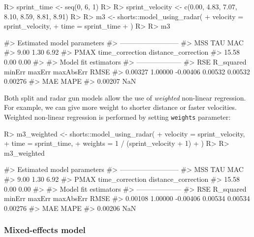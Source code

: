 \documentclass[
]{jss}
\begin{document}
\begin{CodeChunk}
\begin{CodeInput}
R> sprint_time <- seq(0, 6, 1)
R> 
R> sprint_velocity <- c(0.00, 4.83, 7.07, 8.10, 8.59, 8.81, 8.91)
R> 
R> m3 <- shorts::model_using_radar(
+   velocity = sprint_velocity,
+   time = sprint_time
+ )
R> 
R> m3
\end{CodeInput}
\begin{CodeOutput}
#> Estimated model parameters
#> --------------------------
#>                 MSS                 TAU                 MAC 
#>                9.00                1.30                6.92 
#>                PMAX     time_correction distance_correction 
#>               15.58                0.00                0.00 
#> 
#> Model fit estimators
#> --------------------
#>       RSE R_squared    minErr    maxErr maxAbsErr      RMSE 
#>   0.00327   1.00000  -0.00406   0.00532   0.00532   0.00276 
#>       MAE      MAPE 
#>   0.00207       NaN
\end{CodeOutput}
\end{CodeChunk}

Both split and radar gun models allow the use of \emph{weighted} non-linear regression. For example, we can give more weight to shorter distance or faster velocities. Weighted non-linear regression is performed by setting \texttt{weights} parameter:

\begin{CodeChunk}
\begin{CodeInput}
R> m3_weighted <- shorts::model_using_radar(
+   velocity = sprint_velocity,
+   time = sprint_time,
+   weights = 1 / (sprint_velocity + 1)
+ )
R> 
R> m3_weighted
\end{CodeInput}
\begin{CodeOutput}
#> Estimated model parameters
#> --------------------------
#>                 MSS                 TAU                 MAC 
#>                9.00                1.30                6.92 
#>                PMAX     time_correction distance_correction 
#>               15.58                0.00                0.00 
#> 
#> Model fit estimators
#> --------------------
#>       RSE R_squared    minErr    maxErr maxAbsErr      RMSE 
#>   0.00108   1.00000  -0.00406   0.00534   0.00534   0.00276 
#>       MAE      MAPE 
#>   0.00206       NaN
\end{CodeOutput}
\end{CodeChunk}

\hypertarget{mixed-effects-model-1}{%
\subsubsection{Mixed-effects model}\label{mixed-effects-model-1}}
\end{document}
